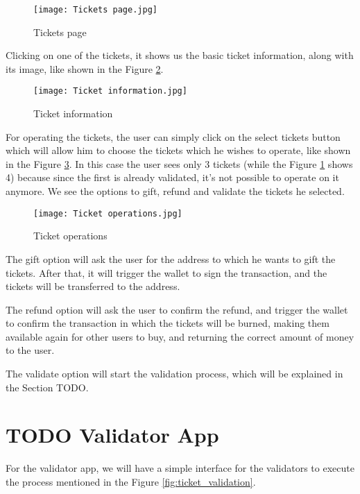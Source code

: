 \begin{figure}[H]
	\texttt{[image: Tickets page.jpg]}
	\centering
	\caption{Tickets page}
	\label{fig:tickets_page}
\end{figure}

Clicking on one of the tickets, it shows us the basic ticket information, along
with its image, like shown in the Figure \ref{fig:ticket_information}.

\begin{figure}[H]
	\texttt{[image: Ticket information.jpg]}
	\centering
	\caption{Ticket information}
	\label{fig:ticket_information}
\end{figure}

For operating the tickets, the user can simply click on the select tickets
button which will allow him to choose the tickets which he wishes to operate,
like shown in the Figure \ref{fig:ticket_operations}. In this case the user
sees only 3 tickets (while the Figure \ref{fig:tickets_page} shows 4) because
since the first is already validated, it's not possible to operate on it
anymore. We see the options to gift, refund and validate the tickets he
selected.

\begin{figure}[H]
	\texttt{[image: Ticket operations.jpg]}
	\centering
	\caption{Ticket operations}
	\label{fig:ticket_operations}
\end{figure}

The gift option will ask the user for the address to which he wants to gift the
tickets. After that, it will trigger the wallet to sign the transaction, and
the tickets will be transferred to the address.

The refund option will ask the user to confirm the refund, and trigger the
wallet to confirm the transaction in which the tickets will be burned, making
them available again for other users to buy, and returning the correct amount
of money to the user.

The validate option will start the validation process, which will be explained
in the Section TODO.

% 
% 

\section{TODO Validator App}
\label{sec:validator_app}

For the validator app, we will have a simple interface for the validators to
execute the process mentioned in the Figure \ref{fig:ticket_validation}.

